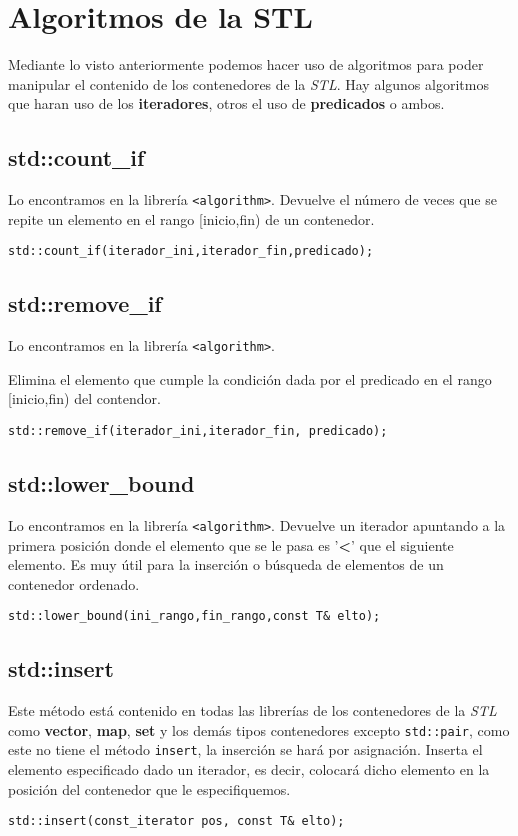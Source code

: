 \section{Algoritmos de la STL}
Mediante lo visto anteriormente podemos hacer uso de algoritmos para poder manipular el contenido de los contenedores de la \textit{STL}.
Hay algunos algoritmos que haran uso de los \textbf{iteradores}, otros el uso de \textbf{predicados} o ambos.

\subsection{std::count\_if}
Lo encontramos en la librería \texttt{<algorithm>}.
Devuelve el número de veces que se repite un elemento en el rango [inicio,fin) de un contenedor.
\begin{center}
	\texttt{std::count\_if(iterador\_ini,iterador\_fin,predicado);}
\end{center}

\subsection{std::remove\_if}Lo encontramos en la librería \texttt{<algorithm>}.

Elimina el elemento que cumple la condición dada por el predicado en el rango [inicio,fin) del contendor.
\begin{center}
	\texttt{std::remove\_if(iterador\_ini,iterador\_fin, predicado);}
\end{center}

\subsection{std::lower\_bound}
Lo encontramos en la librería \texttt{<algorithm>}.
Devuelve un iterador apuntando a la primera posición donde el elemento que se le pasa es '\textbf{\textless}' que el siguiente elemento.
Es muy útil para la inserción o búsqueda de elementos de un contenedor ordenado.
\begin{center}
	\texttt{std::lower\_bound(ini\_rango,fin\_rango,const T\& elto);}
\end{center}

\subsection{std::insert}
Este método está contenido en todas las librerías de los contenedores de la \textit{STL} como \textbf{vector}, \textbf{map}, \textbf{set} y los demás tipos contenedores excepto \texttt{std::pair}, como este no tiene el método \texttt{insert}, la inserción se hará por asignación.
Inserta el elemento especificado dado un iterador, es decir, colocará dicho elemento en la posición del contenedor que le especifiquemos.
\begin{center}
	\texttt{std::insert(const\_iterator pos, const T\& elto);}
\end{center}

